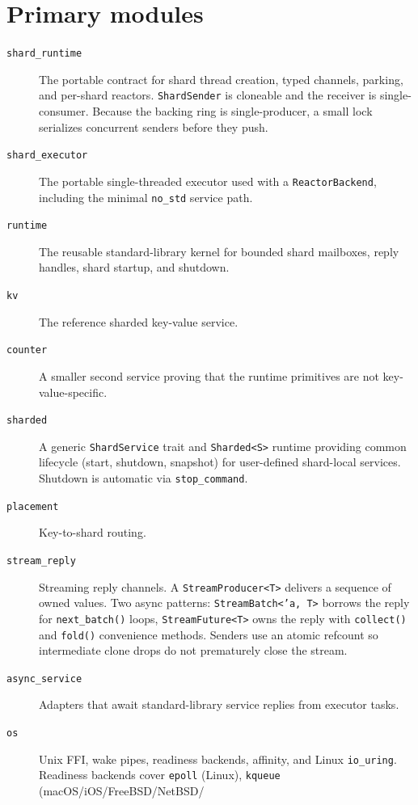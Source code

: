 \section{Primary modules}

\begin{description}
    \item[\texttt{shard\_runtime}] The portable contract for shard thread
        creation, typed channels, parking, and per-shard reactors.
        \texttt{ShardSender} is cloneable and the receiver is single-consumer.
        Because the backing ring is single-producer, a small lock serializes
        concurrent senders before they push.
    \item[\texttt{shard\_executor}] The portable single-threaded executor used
        with a \texttt{ReactorBackend}, including the minimal
        \texttt{no\_std} service path.
    \item[\texttt{runtime}] The reusable standard-library kernel for bounded
        shard mailboxes, reply handles, shard startup, and shutdown.
    \item[\texttt{kv}] The reference sharded key-value service.
    \item[\texttt{counter}] A smaller second service proving that the runtime
        primitives are not key-value-specific.
    \item[\texttt{sharded}] A generic \texttt{ShardService} trait and
        \texttt{Sharded<S>} runtime providing common lifecycle (start, shutdown,
        snapshot) for user-defined shard-local services. Shutdown is automatic
        via \texttt{stop\_command}.
    \item[\texttt{placement}] Key-to-shard routing.
    \item[\texttt{stream\_reply}] Streaming reply channels. A
        \texttt{StreamProducer<T>} delivers a sequence of owned values. Two
        async patterns: \texttt{StreamBatch<'a, T>} borrows the reply for
        \texttt{next\_batch()} loops, \texttt{StreamFuture<T>} owns the reply
        with \texttt{collect()} and \texttt{fold()} convenience methods.
        Senders use an atomic refcount so intermediate clone drops do not
        prematurely close the stream.
    \item[\texttt{async\_service}] Adapters that await standard-library
        service replies from executor tasks.
    \item[\texttt{os}] Unix FFI, wake pipes, readiness backends, affinity, and
        Linux \texttt{io\_uring}. Readiness backends cover
        \texttt{epoll} (Linux), \texttt{kqueue} (macOS/iOS/FreeBSD/NetBSD/

\end{description}

